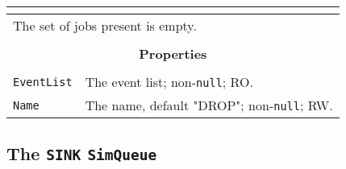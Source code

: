 \documentclass[12pt]{book}
\begin{document}
\begin{tabular}{|l|l|l|}
\multicolumn{3}{|c|}{} \\
\hline
\multicolumn{3}{|l|}{The set of jobs present is empty.} \\
\hline
\multicolumn{3}{|c|}{} \\
\multicolumn{3}{|c|}{\bf Properties} \\
\multicolumn{3}{|c|}{} \\
\hline
\lstinline|EventList| & \multicolumn{2}{|l|}{The event list; non-\lstinline|null|; RO.} \\
\hline
\lstinline|Name|      & \multicolumn{2}{|l|}{The name, default "DROP"; non-\lstinline|null|; RW.} \\
\hline
\end{tabular}

\subsection{The \lstinline{SINK} \lstinline{SimQueue}}
\end{document}
